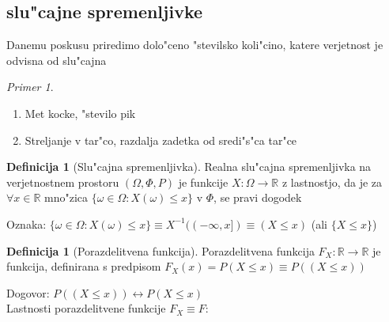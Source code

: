 \documentclass[a4paper,12pt]{article}
\theoremstyle{definition}
\newtheorem{defn}[counter]{Definicija}
\theoremstyle{remark}
\newtheorem*{ex}{Primer}
\newcommand{\R}{\mathbb{R}}
\begin{document}
\subsection{slu"cajne spremenljivke}

Danemu poskusu priredimo dolo"ceno "stevilsko koli"cino, katere verjetnost je odvisna od slu"cajna

\begin{ex} \text{} \\
    \begin{enumerate}
        \item Met kocke, "stevilo pik
        \item Streljanje v tar"co, razdalja zadetka od sredi"s"ca tar"ce
    \end{enumerate}
\end{ex}

\begin{defn}[Slu"cajna spremenljivka]
    Realna slu"cajna spremenljivka na verjetnostnem prostoru $(\Omega, \Phi, P)$ je funkcije $X: \Omega \to \R$ z
    lastnostjo, da je za $\forall x \in \R$ mno"zica $\{\omega \in \Omega: X(\omega) \leq x\}$ v $\Phi$, se pravi dogodek
\end{defn}

Oznaka: $\{\omega \in \Omega: X(\omega) \leq x\} \equiv X^{-1}((-\infty, x]) \equiv (X \leq x)$ (ali $\{X \leq x\}$)

\begin{defn}[Porazdelitvena funkcija]
    Porazdelitvena funkcija $F_X: \R \to \R$ je funkcija, definirana s predpisom $F_X(x) = P(X \leq x) \equiv P((X \leq x))$
\end{defn}

Dogovor: $P((X \leq x)) \leftrightarrow P(X \leq x)$ \\
Lastnosti porazdelitvene funkcije $F_X \equiv F$:
\end{document}
